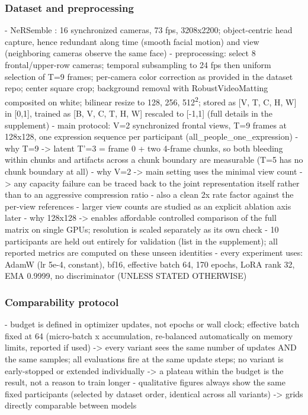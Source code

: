 \subsubsection{Dataset and preprocessing}

- NeRSemble \cite{kirschstein2023nersemble}: 16 synchronized cameras, 73 fps, 3208x2200; object-centric head capture, hence redundant along time (smooth facial motion) and view (neighboring cameras observe the same face)
- preprocessing: select 8 frontal/upper-row cameras; temporal subsampling to 24 fps then uniform selection of T=9 frames; per-camera color correction as provided in the dataset repo; center square crop; background removal with RobustVideoMatting \cite{lin2022robust} composited on white; bilinear resize to {128, 256, 512}\textsuperscript{2}; stored as [V, T, C, H, W] in [0,1], trained as [B, V, C, T, H, W] rescaled to [-1,1] (full details in the supplement)
- main protocol: V=2 synchronized frontal views, T=9 frames at 128x128, one expression sequence per participant (all_people_one_expression)
- why T=9 -> latent T'=3 = frame 0 + two 4-frame chunks, so both bleeding within chunks and artifacts across a chunk boundary are measurable (T=5 has no chunk boundary at all)
- why V=2 -> main setting uses the minimal view count -> any capacity failure can be traced back to the joint representation itself rather than to an aggressive compression ratio
    - also a clean 2x rate factor against the per-view references
    - larger view counts are studied as an explicit ablation axis later
- why 128x128 -> enables affordable controlled comparison of the full matrix on single GPUs; resolution is scaled separately as its own check
- 10 participants are held out entirely for validation (list in the supplement); all reported metrics are computed on these unseen identities
- every experiment uses: AdamW (lr 5e-4, constant), bf16, effective batch 64, 170 epochs, LoRA rank 32, EMA 0.9999, no discriminator (UNLESS STATED OTHERWISE)

\subsubsection{Comparability protocol}

- budget is defined in optimizer updates, not epochs or wall clock; effective batch fixed at 64 (micro-batch x accumulation, re-balanced automatically on memory limits, reported if used) -> every variant sees the same number of updates AND the same samples; all evaluations fire at the same update steps; no variant is early-stopped or extended individually -> a plateau within the budget is the result, not a reason to train longer
- qualitative figures always show the same fixed participants (selected by dataset order, identical across all variants) -> grids directly comparable between models


